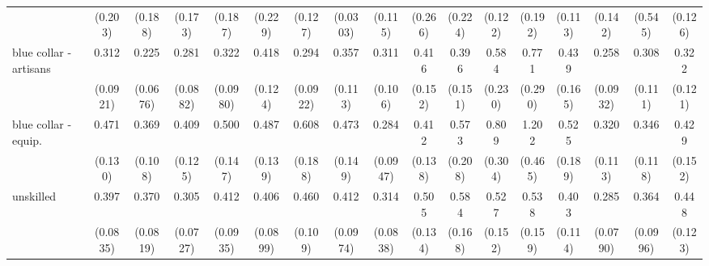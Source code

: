 {\begin{tabular}{l*{16}{c}}
                    &     (0.203)         &     (0.188)         &     (0.173)         &     (0.187)         &     (0.229)         &     (0.127)         &    (0.0303)         &     (0.115)         &     (0.266)         &     (0.224)         &     (0.122)         &     (0.192)         &     (0.113)         &     (0.142)         &     (0.545)         &     (0.126)         \\
[1em]
blue collar - artisans&       0.312\sym{***}&       0.225\sym{***}&       0.281\sym{***}&       0.322\sym{***}&       0.418\sym{**} &       0.294\sym{***}&       0.357\sym{**} &       0.311\sym{***}&       0.416\sym{*}  &       0.396\sym{*}  &       0.584         &       0.771         &       0.439\sym{*}  &       0.258\sym{***}&       0.308\sym{**} &       0.322\sym{**} \\
                    &    (0.0921)         &    (0.0676)         &    (0.0882)         &    (0.0980)         &     (0.124)         &    (0.0922)         &     (0.113)         &     (0.106)         &     (0.152)         &     (0.151)         &     (0.230)         &     (0.290)         &     (0.165)         &    (0.0932)         &     (0.111)         &     (0.121)         \\
[1em]
blue collar - equip.&       0.471\sym{**} &       0.369\sym{***}&       0.409\sym{**} &       0.500\sym{*}  &       0.487\sym{*}  &       0.608         &       0.473\sym{*}  &       0.284\sym{***}&       0.412\sym{**} &       0.573         &       0.809         &       1.202         &       0.525         &       0.320\sym{**} &       0.346\sym{**} &       0.429\sym{*}  \\
                    &     (0.130)         &     (0.108)         &     (0.125)         &     (0.147)         &     (0.139)         &     (0.188)         &     (0.149)         &    (0.0947)         &     (0.138)         &     (0.208)         &     (0.304)         &     (0.465)         &     (0.189)         &     (0.113)         &     (0.118)         &     (0.152)         \\
[1em]
unskilled           &       0.397\sym{***}&       0.370\sym{***}&       0.305\sym{***}&       0.412\sym{***}&       0.406\sym{***}&       0.460\sym{**} &       0.412\sym{***}&       0.314\sym{***}&       0.505\sym{*}  &       0.584         &       0.527\sym{*}  &       0.538\sym{*}  &       0.403\sym{**} &       0.285\sym{***}&       0.364\sym{***}&       0.448\sym{**} \\
                    &    (0.0835)         &    (0.0819)         &    (0.0727)         &    (0.0935)         &    (0.0899)         &     (0.109)         &    (0.0974)         &    (0.0838)         &     (0.134)         &     (0.168)         &     (0.152)         &     (0.159)         &     (0.114)         &    (0.0790)         &    (0.0996)         &     (0.123)         \\

\end{tabular}}
